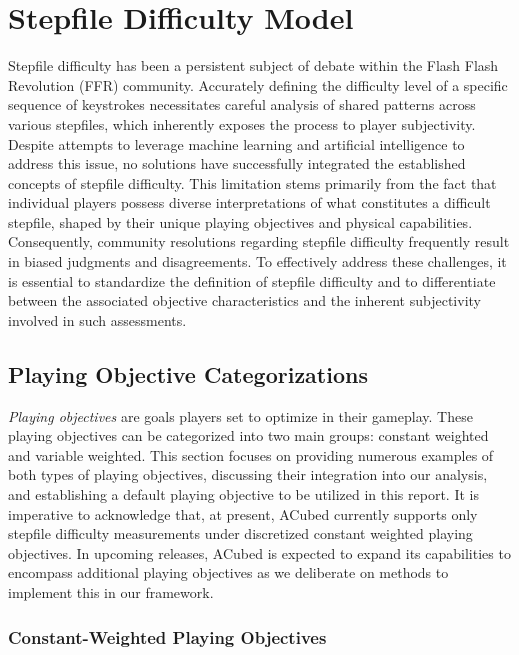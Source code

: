 \section{Stepfile Difficulty Model}
\label{sec:stepfile_difficulty}

Stepfile difficulty has been a persistent subject of debate within the Flash Flash Revolution (FFR) community. Accurately defining the difficulty level of a specific sequence of keystrokes necessitates careful analysis of shared patterns across various stepfiles, which inherently exposes the process to player subjectivity. Despite attempts to leverage machine learning and artificial intelligence to address this issue, no solutions have successfully integrated the established concepts of stepfile difficulty. This limitation stems primarily from the fact that individual players possess diverse interpretations of what constitutes a difficult stepfile, shaped by their unique playing objectives and physical capabilities. Consequently, community resolutions regarding stepfile difficulty frequently result in biased judgments and disagreements. To effectively address these challenges, it is essential to standardize the definition of stepfile difficulty and to differentiate between the associated objective characteristics and the inherent subjectivity involved in such assessments.

\subsection{Playing Objective Categorizations}

\textit{Playing objectives} are goals players set to optimize in their gameplay. These playing objectives can be categorized into two main groups: constant weighted and variable weighted. This section focuses on providing numerous examples of both types of playing objectives, discussing their integration into our analysis, and establishing a default playing objective to be utilized in this report. It is imperative to acknowledge that, at present, ACubed currently supports only stepfile difficulty measurements under discretized constant weighted playing objectives. In upcoming releases, ACubed is expected to expand its capabilities to encompass additional playing objectives as we deliberate on methods to implement this in our framework.

\subsubsection{Constant-Weighted Playing Objectives}

